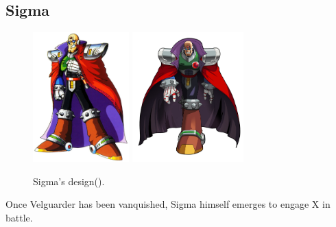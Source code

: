 \subsection{Sigma}\label{boss:Sigma_x1}
\begin{figure}[htp]
	\centering
	\includegraphics[height=5cm]{figures/X1/Sigma_stages/Sigma.jpg}
	\includegraphics[height=5cm]{figures/X1/Sigma_stages/MHXSigma.jpg}
	\caption{Sigma's design(\cite{book:MMX_Complete_art}).}
\end{figure}
Once Velguarder has been vanquished, Sigma himself emerges to engage X in battle.

